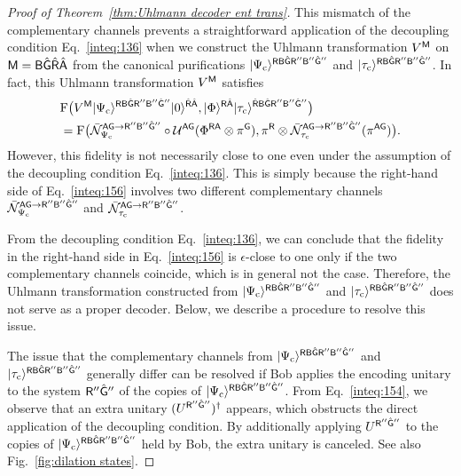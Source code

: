 \begin{proof}[Proof of Theorem~\ref{thm:Uhlmann decoder ent trans}]
This mismatch of the complementary channels prevents a straightforward application of the decoupling condition Eq.~\eqref{inteq:136} when we construct the Uhlmann transformation $V^{\mathsf{M}}$ on ${\mathsf{M}} = {\mathsf{B}}\hat{{\mathsf{G}}}\hat{{\mathsf{R}}}\hat{{\mathsf{A}}}$ from the canonical purifications $|\Psi_{\rm c}\rangle^{{\mathsf{R}}{\mathsf{B}}\hat{{\mathsf{G}}}{\mathsf{R}}''{\mathsf{B}}''\hat{{\mathsf{G}}}''}$ and $|\tau_{\rm c}\rangle^{{\mathsf{R}}{\mathsf{B}}\hat{{\mathsf{G}}}{\mathsf{R}}''{\mathsf{B}}''\hat{{\mathsf{G}}}''}$.
In fact, this Uhlmann transformation $V^{\mathsf{M}}$ satisfies  
\begin{align}
    &{\mathrm{F}}\big(V^{\mathsf{M}}|\Psi_{\rm c}\rangle^{{\mathsf{R}}{\mathsf{B}}\hat{{\mathsf{G}}}{\mathsf{R}}''{\mathsf{B}}''\hat{{\mathsf{G}}}''}|0\rangle^{\hat{{\mathsf{R}}}\hat{{\mathsf{A}}}}, |\Phi\rangle^{{\mathsf{R}}\hat{{\mathsf{A}}}}|\tau_{\rm c}\rangle^{\hat{{\mathsf{R}}}{\mathsf{B}}\hat{{\mathsf{G}}}{\mathsf{R}}''{\mathsf{B}}''\hat{{\mathsf{G}}}''}\big) \notag \\
    \label{inteq:156}
    &= {\mathrm{F}}\big(\bar{{\mathcal{N}}}_{\Psi_{\rm c}}^{{\mathsf{A}}{\mathsf{G}}\rightarrow{\mathsf{R}}''{\mathsf{B}}''\hat{{\mathsf{G}}}''}\circ{\mathcal{U}}^{{\mathsf{A}}{\mathsf{G}}}(\Phi^{{\mathsf{R}}{\mathsf{A}}} \otimes \pi^{\mathsf{G}}), \pi^{\mathsf{R}}\otimes\bar{{\mathcal{N}}}_{\tau_{\rm c}}^{{\mathsf{A}}{\mathsf{G}}\rightarrow{\mathsf{R}}''{\mathsf{B}}''\hat{{\mathsf{G}}}''}(\pi^{{\mathsf{A}}{\mathsf{G}}})\big). 
\end{align}
However, this fidelity is not necessarily close to one even under the assumption of the decoupling condition Eq.~\eqref{inteq:136}.
This is simply because
the right-hand side of Eq.~\eqref{inteq:156} involves two different complementary channels $\bar{{\mathcal{N}}}_{\Psi_{\rm c}}^{{\mathsf{A}}{\mathsf{G}}\rightarrow{\mathsf{R}}''{\mathsf{B}}''\hat{{\mathsf{G}}}''}$ and $\bar{{\mathcal{N}}}_{\tau_{\rm c}}^{{\mathsf{A}}{\mathsf{G}}\rightarrow{\mathsf{R}}''{\mathsf{B}}''\hat{{\mathsf{G}}}''}$.



From the decoupling condition Eq.~\eqref{inteq:136}, we can conclude that the fidelity in the right-hand side in Eq.~\eqref{inteq:156} is $\epsilon$-close to one only if the two complementary channels coincide, which is in general not the case.
Therefore, the Uhlmann transformation constructed from $|\Psi_{\rm c}\rangle^{{\mathsf{R}}{\mathsf{B}}\hat{{\mathsf{G}}}{\mathsf{R}}''{\mathsf{B}}''\hat{{\mathsf{G}}}''}$ and $|\tau_{\rm c}\rangle^{{\mathsf{R}}{\mathsf{B}}\hat{{\mathsf{G}}}{\mathsf{R}}''{\mathsf{B}}''\hat{{\mathsf{G}}}''}$ does not serve as a proper decoder.
Below, we describe a procedure to resolve this issue.




The issue that the complementary channels from $|\Psi_{\rm c}\rangle^{{\mathsf{R}}{\mathsf{B}}\hat{{\mathsf{G}}}{\mathsf{R}}''{\mathsf{B}}''\hat{{\mathsf{G}}}''}$ and $|\tau_{\rm c}\rangle^{{\mathsf{R}}{\mathsf{B}}\hat{{\mathsf{G}}}{\mathsf{R}}''{\mathsf{B}}''\hat{{\mathsf{G}}}''}$ generally differ can be resolved if Bob applies the encoding unitary to the system ${\mathsf{R}}''\hat{{\mathsf{G}}}''$ of the copies of $|\Psi_{\rm c}\rangle^{{\mathsf{R}}{\mathsf{B}}\hat{{\mathsf{G}}}{\mathsf{R}}''{\mathsf{B}}''\hat{{\mathsf{G}}}''}$.
From Eq.~\eqref{inteq:154}, we observe that an extra unitary $(U^{{\mathsf{R}}''\hat{{\mathsf{G}}}''})^\dag$ appears, which obstructs the direct application of the decoupling condition.
By additionally applying $U^{{\mathsf{R}}''\hat{{\mathsf{G}}}''}$ to the copies of $|\Psi_{\rm c}\rangle^{{\mathsf{R}}{\mathsf{B}}\hat{{\mathsf{G}}}{\mathsf{R}}''{\mathsf{B}}''\hat{{\mathsf{G}}}''}$ held by Bob, the extra unitary is canceled.
See also Fig.~\ref{fig:dilation states}.




\end{proof}
